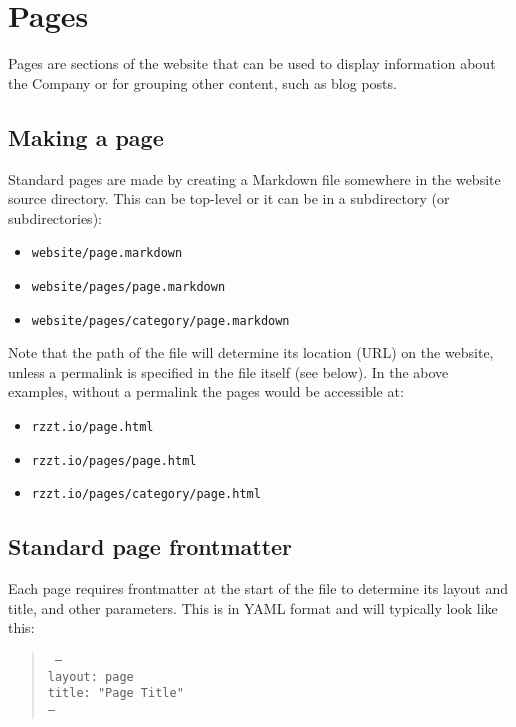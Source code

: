 \chapter{Pages}

Pages are sections of the website that can be used to display information about the Company or for grouping other content, such as blog posts.

\section{Making a page}

Standard pages are made by creating a Markdown file somewhere in the website source directory. This can be top-level or it can be in a subdirectory (or subdirectories):

\begin{itemize}
  \item \texttt{website/page.markdown}
  \item \texttt{website/pages/page.markdown}
  \item \texttt{website/pages/category/page.markdown}
\end{itemize}

Note that the path of the file will determine its location (URL) on the website, unless a permalink is specified in the file itself (see below). In the above examples, without a permalink the pages would be accessible at:

\begin{itemize}
  \item \texttt{rzzt.io/page.html}
  \item \texttt{rzzt.io/pages/page.html}
  \item \texttt{rzzt.io/pages/category/page.html}
\end{itemize}

\section{Standard page frontmatter}

Each page requires frontmatter at the start of the file to determine its layout and title, and other parameters. This is in YAML format and will typically look like this:

\begin{quote}
  \texttt{%
    ---\\
    layout: page\\
    title: "Page Title"\\
    ---
  }
\end{quote}

